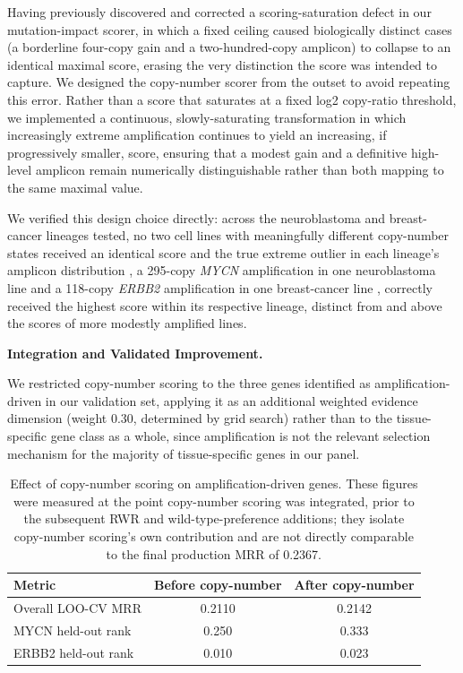\documentclass[author={Karen Coutinho, Ishaan Bhalla, Aman Raj, Dixit Kaloorani Malarmannan},
                supervisor={Dr. Daniel D'Andrea},
                degree={MSc},
                title={CellSelector Omics: A Multi-Omics Recommendation System for Cell Line Selection},
                subtitle={},
                type={},
                year={2026}]{dissertation}
\begin{document}
Having previously discovered and corrected a scoring-saturation defect in our mutation-impact scorer, in which a fixed ceiling caused biologically distinct cases (a borderline four-copy gain and a two-hundred-copy amplicon) to collapse to an identical maximal score, erasing the very distinction the score was intended to capture. We designed the copy-number scorer from the outset to avoid repeating this error. Rather than a score that saturates at a fixed log2 copy-ratio threshold, we implemented a continuous, slowly-saturating transformation in which increasingly extreme amplification continues to yield an increasing, if progressively smaller, score, ensuring that a modest gain and a definitive high-level amplicon remain numerically distinguishable rather than both mapping to the same maximal value.

We verified this design choice directly: across the neuroblastoma and breast-cancer lineages tested, no two cell lines with meaningfully different copy-number states received an identical score and the true extreme outlier in each lineage's amplicon distribution , a 295-copy \textit{MYCN} amplification in one neuroblastoma line and a 118-copy \textit{ERBB2} amplification in one breast-cancer line , correctly received the highest score within its respective lineage, distinct from and above the scores of more modestly amplified lines.

{\bf Integration and Validated Improvement.}

We restricted copy-number scoring to the three genes identified as amplification-driven in our validation set, applying it as an additional weighted evidence dimension (weight 0.30, determined by grid search) rather than to the tissue-specific gene class as a whole, since amplification is not the relevant selection mechanism for the majority of tissue-specific genes in our panel.

\begin{table}[t]
\centering
\small
\begin{tabular}{|l|c|c|}
\hline
{\bf Metric} & {\bf Before copy-number} & {\bf After copy-number} \\
\hline
Overall LOO-CV MRR & 0.2110 & 0.2142 \\
MYCN held-out rank & 0.250 & 0.333 \\
ERBB2 held-out rank & 0.010 & 0.023 \\
\hline
\end{tabular}
\caption{Effect of copy-number scoring on amplification-driven genes. These figures were measured at the point copy-number scoring was integrated, prior to the subsequent RWR and wild-type-preference additions; they isolate copy-number scoring's own contribution and are not directly comparable to the final production MRR of 0.2367.}
\label{tab:copy-number-improvement}
\end{table}
\end{document}
